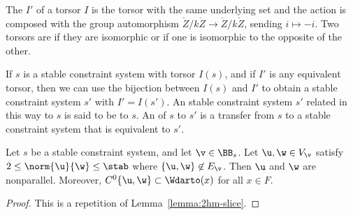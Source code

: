 \begin{definition}
 The  $I'$ of a torsor $I$ is the torsor with the
same underlying set and the action is composed with the group automorphism
$\ring{Z}/k\ring{Z}\to\ring{Z}/k\ring{Z}$, sending $i\mapsto -i$.
Two torsors are  if they are isomorphic or if 
one is isomorphic to the opposite of the other.
\end{definition}

If $s$ is a stable constraint system with torsor $I(s)$, and if
$I'$ is any equivalent torsor, then we can use the bijection between $I(s)$ and $I'$
to obtain a stable constraint system $s'$ with $I' = I(s')$.  An
stable constraint system $s'$ related in this way to $s$ is said
to be  to $s$.  An  of $s$
to $s'$ is a transfer from $s$ to a stable constraint system that
is equivalent to $s'$.

\begin{lemma}[]\label{lemma:2hm-slice1}
Let $s$ be a stable constraint system, and let $\v\in \BB_s$.
Let $\u,\w\in V_\v$ satisfy $2\le\norm{\u}{\w}\le \stab$ where
$\{\u,\w\}\not\in E_\v$.  Then $\u$ and $\w$ are nonparallel.
Moreover,
$C^0\{\u,\w\}\subset \Wdarto(x)$ for all $x\in F$.
\end{lemma}


\begin{proof}  This is a repetition of Lemma~\ref{lemma:2hm-slice}.
\end{proof}


